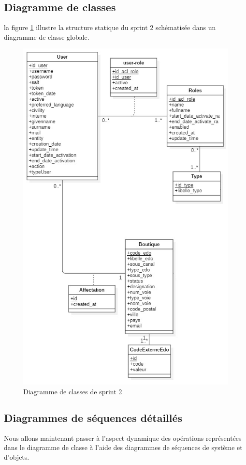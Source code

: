 \subsection{Diagramme de classes}
la figure \ref{fig:classdiag-sprint2} illustre la structure statique du sprint 2 schématisée dans un diagramme de classe globale.
\begin{figure}[H]
	\centering
	\includegraphics[width=0.5\linewidth]{img/conception/classes/ClassDiag-sprint2}
	\caption[Diagramme de classes de sprint 2]{Diagramme de classes de sprint 2}
	\label{fig:classdiag-sprint2}
\end{figure}

\subsection{Diagrammes de séquences détaillés}
Nous allons maintenant passer à l’aspect dynamique des opérations représentées dans le diagramme de classe à l’aide des diagrammes de séquences de système et d’objets.
